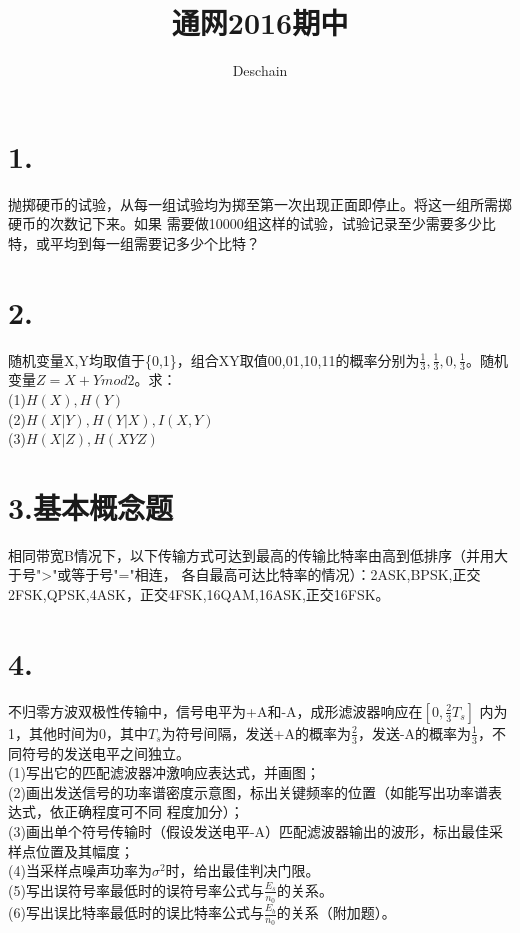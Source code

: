 \documentclass[UTF8]{ctexart}
\title{通网2016期中}
\author{Deschain}
\begin{document}
\maketitle
\section*{1.}
抛掷硬币的试验，从每一组试验均为掷至第一次出现正面即停止。将这一组所需掷硬币的次数记下来。如果
需要做10000组这样的试验，试验记录至少需要多少比特，或平均到每一组需要记多少个比特？
\section*{2.}
随机变量X,Y均取值于\{0,1\}，组合XY取值00,01,10,11的概率分别为$\frac{1}{3},
  \frac{1}{3},0,\frac{1}{3}$。随机变量$Z=X+Ymod2$。求：\\
(1)$H(X),H(Y)$\\
(2)$H(X\lvert Y),H(Y\lvert X),I(X,Y)$\\
(3)$H(X\lvert Z),H(XYZ)$\\
\section*{3.基本概念题\\}
相同带宽B情况下，以下传输方式可达到最高的传输比特率由高到低排序（并用大于号">"或等于号"="相连，
各自最高可达比特率的情况）：2ASK,BPSK,正交2FSK,QPSK,4ASK，正交4FSK,16QAM,16ASK,正交16FSK。
\section*{4.}
不归零方波双极性传输中，信号电平为+A和-A，成形滤波器响应在$[0,\frac{2}{3}T_s]$
内为1，其他时间为0，其中$T_s$为符号间隔，发送+A的概率为$\frac{2}{3}$，发送-A的概率为$\frac
  {1}{3}$，不同符号的发送电平之间独立。\\
(1)写出它的匹配滤波器冲激响应表达式，并画图；\\
(2)画出发送信号的功率谱密度示意图，标出关键频率的位置（如能写出功率谱表达式，依正确程度可不同
程度加分）；\\
(3)画出单个符号传输时（假设发送电平-A）匹配滤波器输出的波形，标出最佳采样点位置及其幅度；\\
(4)当采样点噪声功率为$\sigma^2$时，给出最佳判决门限。\\
(5)写出误符号率最低时的误符号率公式与$\frac{E_s}{n_0}$的关系。\\
(6)写出误比特率最低时的误比特率公式与$\frac{E_b}{n_0}$的关系（附加题）。\\
\end{document}
